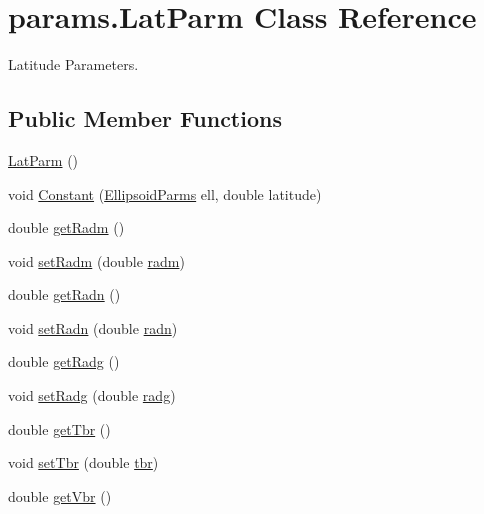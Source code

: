 \hypertarget{classparams_1_1_lat_parm}{}\section{params.\+Lat\+Parm Class Reference}
\label{classparams_1_1_lat_parm}


Latitude Parameters.  


\subsection*{Public Member Functions}
\begin{DoxyCompactItemize}
\item 
\hyperlink{classparams_1_1_lat_parm_ac972450505dda8d2633ee4c293339f4d}{Lat\+Parm} ()
\item 
void \hyperlink{classparams_1_1_lat_parm_ab81d2c45f65a3a260dd99fcc49235e8b}{Constant} (\hyperlink{classparams_1_1_ellipsoid_parms}{Ellipsoid\+Parms} ell, double latitude)
\item 
double \hyperlink{classparams_1_1_lat_parm_ab29d1d8f8fdec25662aef30d992b820b}{get\+Radm} ()
\item 
void \hyperlink{classparams_1_1_lat_parm_a00c0204cb9ef92752ffd4a869b780360}{set\+Radm} (double \hyperlink{classparams_1_1_lat_parm_ad4a3a2c6c45ffe5b13b953a639f3771f}{radm})
\item 
double \hyperlink{classparams_1_1_lat_parm_a6d929177720c027458ebdf315f184a16}{get\+Radn} ()
\item 
void \hyperlink{classparams_1_1_lat_parm_a59b9f34911eaf1358f7b5b409d7bf0b4}{set\+Radn} (double \hyperlink{classparams_1_1_lat_parm_ad3b2a94593c3527d6e5bcb7a4f5008d0}{radn})
\item 
double \hyperlink{classparams_1_1_lat_parm_a25b420d545fbfc3b0663f2db9b8d639b}{get\+Radg} ()
\item 
void \hyperlink{classparams_1_1_lat_parm_afb0ecd1622a4d32f82e62c4a7b20b82c}{set\+Radg} (double \hyperlink{classparams_1_1_lat_parm_ac80005b5ba749048ae964321cfe5760d}{radg})
\item 
double \hyperlink{classparams_1_1_lat_parm_a08d8466c691aff294ec925b2ad5fbca7}{get\+Tbr} ()
\item 
void \hyperlink{classparams_1_1_lat_parm_a91313d31ec47399198769d5c8dc7c8ca}{set\+Tbr} (double \hyperlink{classparams_1_1_lat_parm_a9a38ab3ef2e8fafcf667aa32e714ea33}{tbr})
\item 
double \hyperlink{classparams_1_1_lat_parm_a3ad1b1f03ea01388668de0b1b906eb15}{get\+Vbr} ()

\end{DoxyCompactItemize}
